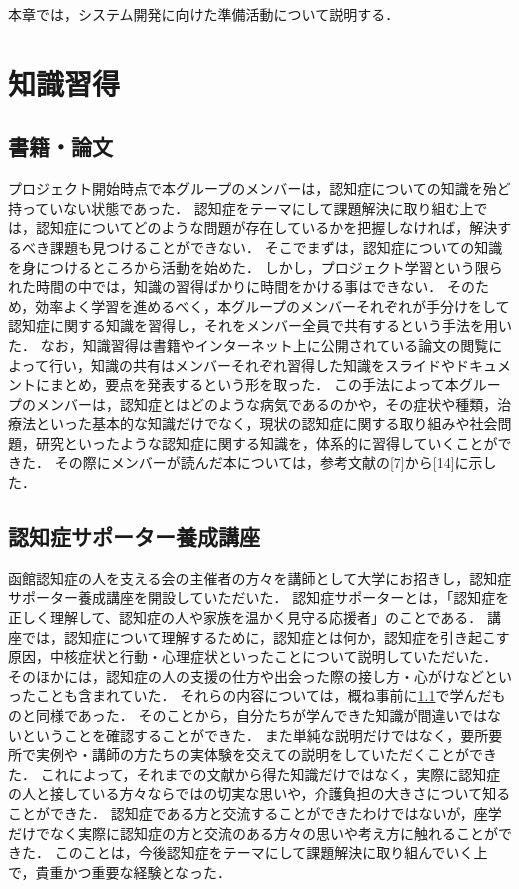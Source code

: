 \documentclass[../report]{subfiles}
\begin{document}
本章では，システム開発に向けた準備活動について説明する．


\section{知識習得}
\subsection{書籍・論文} \label{sec:document-article}
プロジェクト開始時点で本グループのメンバーは，認知症についての知識を殆ど持っていない状態であった．
認知症をテーマにして課題解決に取り組む上では，認知症についてどのような問題が存在しているかを把握しなければ，解決するべき課題も見つけることができない．
そこでまずは，認知症についての知識を身につけるところから活動を始めた．
しかし，プロジェクト学習という限られた時間の中では，知識の習得ばかりに時間をかける事はできない．
そのため，効率よく学習を進めるべく，本グループのメンバーそれぞれが手分けをして認知症に関する知識を習得し，それをメンバー全員で共有するという手法を用いた．
なお，知識習得は書籍やインターネット上に公開されている論文の閲覧によって行い，知識の共有はメンバーそれぞれ習得した知識をスライドやドキュメントにまとめ，要点を発表するという形を取った．
この手法によって本グループのメンバーは，認知症とはどのような病気であるのかや，その症状や種類，治療法といった基本的な知識だけでなく，現状の認知症に関する取り組みや社会問題，研究といったような認知症に関する知識を，体系的に習得していくことができた．
その際にメンバーが読んだ本については，参考文献の[7]から[14]に示した．

\subsection{認知症サポーター養成講座}
函館認知症の人を支える会の主催者の方々を講師として大学にお招きし，認知症サポーター養成講座を開設していただいた．
認知症サポーターとは，「認知症を正しく理解して、認知症の人や家族を温かく見守る応援者」のことである．
講座では，認知症について理解するために，認知症とは何か，認知症を引き起こす原因，中核症状と行動・心理症状といったことについて説明していただいた．
そのほかには，認知症の人の支援の仕方や出会った際の接し方・心がけなどといったことも含まれていた．
それらの内容については，概ね事前に\ref{sec:document-article}で学んだものと同様であった．
そのことから，自分たちが学んできた知識が間違いではないということを確認することができた．
また単純な説明だけではなく，要所要所で実例や・講師の方たちの実体験を交えての説明をしていただくことができた．
これによって，それまでの文献から得た知識だけではなく，実際に認知症の人と接している方々ならではの切実な思いや，介護負担の大きさについて知ることができた．
認知症である方と交流することができたわけではないが，座学だけでなく実際に認知症の方と交流のある方々の思いや考え方に触れることができた．
このことは，今後認知症をテーマにして課題解決に取り組んでいく上で，貴重かつ重要な経験となった．
\end{document}
